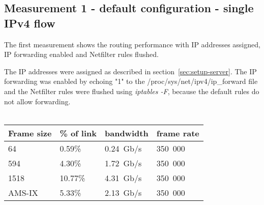 
\subsection{Measurement 1 - default configuration - single IPv4 flow}
The first measurement shows the routing performance with
IP addresses assigned, IP forwarding enabled and Netfilter rules flushed.

The IP addresses were assigned as described in section~\ref{sec:setup-server}.
The IP forwarding was enabled by echoing "1" to the /proc/sys/net/ipv4/ip\_forward file and the Netfilter rules
were flushed using {\it{iptables -F}}, because the default rules do not allow forwarding.
\\
\\
\begin{tabular}{ | l | l | l | l | }
\hline
Frame size & \% of link & bandwidth & frame rate \\
\hline
64     &  0.59\% & 0.24~Gb/s & 350~000 \\
594    &  4.30\% & 1.72~Gb/s & 350~000 \\
1518   & 10.77\% & 4.31~Gb/s & 350~000 \\
AMS-IX &  5.33\% & 2.13~Gb/s & 350~000 \\
\hline
\end{tabular}
